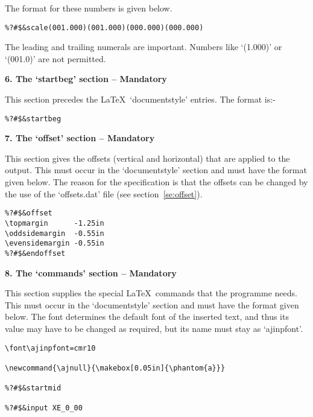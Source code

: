 The format for these numbers is given below. 

\begin{verbatim}
%?#$&scale(001.000)(001.000)(000.000)(000.000)
\end{verbatim}

The leading and trailing numerals are important. Numbers like `(1.000)' 
or `(001.0)' are not permitted.

\vspace*{0.2cm}
{\bf \large 6. The `startbeg' section -- Mandatory}
\vspace*{0.2cm}

This section precedes the \LaTeX\ `documentstyle' entries. The format is:- 

\begin{verbatim}
%?#$&startbeg
\end{verbatim}

\vspace*{0.2cm}
{\bf \large 7. The `offset' section -- Mandatory}
\vspace*{0.2cm}

This section gives the offsets (vertical and horizontal) that are applied
to the output. This must occur in the `documentstyle' section and must have
the format given below. The reason for the specification is that the
offsets can be changed by the use of the `offsets.dat' file (see
section~\ref{se:offset}). 

\begin{verbatim}
%?#$&offset
\topmargin      -1.25in
\oddsidemargin  -0.55in
\evensidemargin -0.55in
%?#$&endoffset
\end{verbatim}

\vspace*{0.2cm}
{\bf \large 8. The `commands' section -- Mandatory}
\vspace*{0.2cm}

This section supplies the special \LaTeX\ commands that the programme
needs. This must occur in the `documentstyle' section and must have the
format given below. The font determines the default font of the inserted
text, and thus its value may have to be changed as required, but its name
must stay as `ajinpfont'. 

\begin{verbatim}
\font\ajinpfont=cmr10

\newcommand{\ajnull}{\makebox[0.05in]{\phantom{a}}}

%?#$&startmid

%?#$&input XE_0_00
\end{verbatim}

